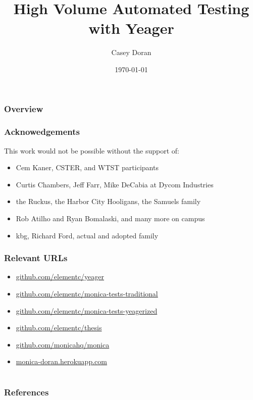 \documentclass{beamer}
\title[Yeager]{High Volume Automated Testing with Yeager}
\author{Casey Doran}
\institute[Florida Tech]
{
Florida Institute of Technology \\
\medskip
\textit{cdoran2011@my.fit.edu}
}
\date{\today}
\begin{document}
\begin{frame}
\titlepage
\end{frame}

\begin{frame}
\frametitle{Overview}
\tableofcontents
\end{frame}

\begin{frame}
  \frametitle{Acknowedgements}
  This work would not be possible without the support of:
  \begin{itemize}
    \item Cem Kaner, CSTER, and WTST participants
    \item Curtis Chambers, Jeff Farr, Mike DeCabia at Dycom Industries
    \item the Ruckus, the Harbor City Hooligans, the Samuels family
    \item Rob Atilho and Ryan Bomalaski, and many more on campus
    \item kbg, Richard Ford, actual and adopted family
  \end{itemize}
\end{frame}


\begin{frame}
  \frametitle{Relevant URLs}
  \begin{itemize}
    \item \url{github.com/elementc/yeager}
    \item \url{github.com/elementc/monica-tests-traditional}
    \item \url{github.com/elementc/monica-tests-yeagerized}
    \item \url{github.com/elementc/thesis}
    \item \url{github.com/monicahq/monica}
    \item \url{monica-doran.herokuapp.com}
  \end{itemize}
\end{frame}





\section{} %

\begin{frame}[t, allowframebreaks]
\frametitle{References}


\end{frame}
\end{document}
